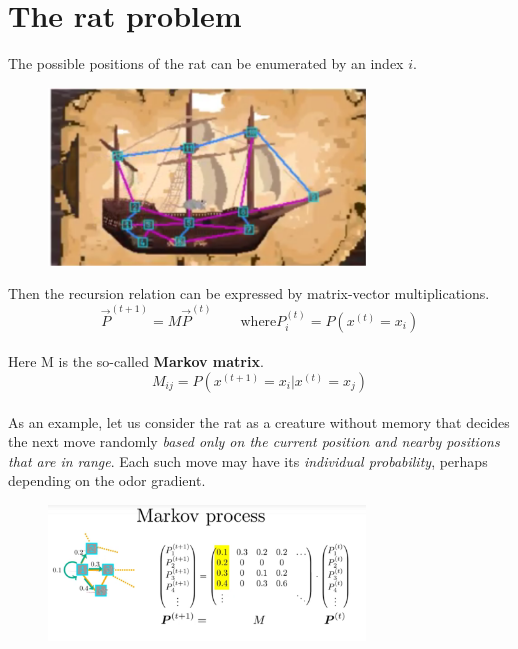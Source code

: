 \documentclass[12pt, a4paper]{scrartcl}
\begin{document}
\section*{The rat problem}
The possible positions of the rat can be enumerated by an index $i$. %
 \begin{figure}[H]
	\centering
	\includegraphics[width=0.75\textwidth]{5_8.png}
\end{figure}
Then the recursion relation can be expressed by matrix-vector multiplications. 
\begin{equation*}\boxed{\vec{P}^{(t+1)}=M\vec{P}^{(t)} \qquad \text{where} P_i^{(t)}=P(x^{(t)}=x_i)
}\end{equation*}\\
Here M is the so-called \textbf{Markov matrix}.
\begin{equation*}\boxed{ M_{ij}=P(x^{(t+1)}=x_i|x^{(t)}=x_j)
}\end{equation*}\\

As an example, let us consider the rat as a creature without memory that decides the next move randomly \textit{based only on the current position and nearby positions that are in range}. Each such move may have its \textit{individual probability}, perhaps depending on the odor gradient. \\
 \begin{figure}[H]
	\centering
	\includegraphics[width=0.75\textwidth]{5_9.png}
\end{figure}
\end{document}
